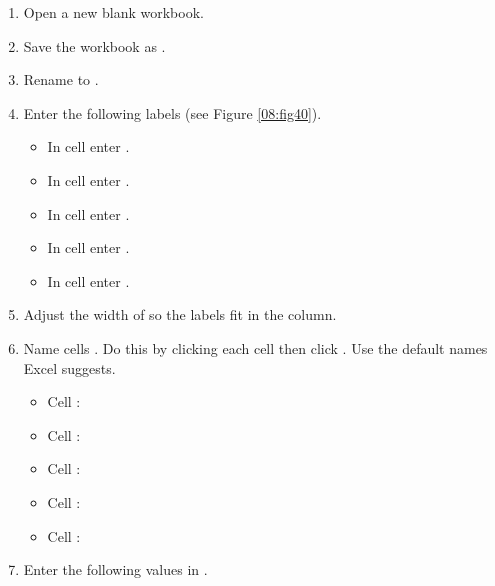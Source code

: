 \begin{enumbox}
	\begin{enumerate}
		\item Open a new blank workbook.
		\item Save the workbook as .
		\item Rename  to .
		\item Enter the following labels (see Figure \ref{08:fig40}).
		
		\begin{itemize}
			\item In cell  enter .
			\item In cell  enter .
			\item In cell  enter .
			\item In cell  enter .
			\item In cell  enter .
		\end{itemize}
		
		\item Adjust the width of  so the labels fit in the column.
		\item Name cells . Do this by clicking each cell then click . Use the default names Excel suggests.
	
		\begin{itemize}
			\item Cell : 
			\item Cell : 
			\item Cell : 
			\item Cell : 
			\item Cell : 
		\end{itemize}
	
		\item Enter the following values in .
	

\end{enumerate}
\end{enumbox}
